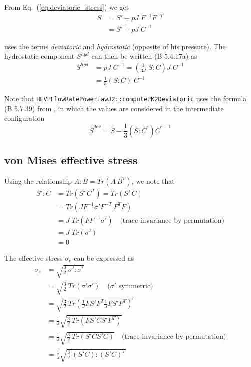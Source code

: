 \documentclass[]{scrreprt}
\begin{document}
From Eq.~(\ref{eq:deviatoric_stress}) we get
\begin{align}
	  S  & = S' + pJ\;F^{-1}F^{-T} \nonumber \\
	     & = S' + pJ\;C^{-1}
\end{align}

\citet{Belytschko2014} uses the terms \textit{deviatoric} and \textit{hydrostatic} (opposite of his pressure). The hydrostatic component $S^{hyd}$ can then be written (B 5.4.17a) as
\begin{align}
	  S^{hyd}  & = pJ\;C^{-1} = (\frac{1}{3J}\;S:C)J\;C^{-1} \nonumber \\
	     & = \frac{1}{3}(S:C)\;C^{-1}
\end{align}

Note that \texttt{HEVPFlowRatePowerLawJ2::computePK2Deviatoric} uses the formula (B 5.7.39) from \citep{Belytschko2014}, in which the values are considered in the intermediate configuration 
\begin{equation}
	\bar{S}^{dev}=\bar{S}-\frac{1}{3}(\bar{S}:\bar{C}^e)\bar{C}^{e-1}
\end{equation}

\subsection{von Mises effective stress}
Using the relationship $A:B=Tr(A\,B^T)$, we note that
\begin{align}
	  S':C  & = Tr(S'\,C^T) =  Tr(S'\,C) \nonumber \\
	        & = Tr(JF^{-1}\sigma'F^{-T}\:F^T F) \nonumber \\
	        & = J\;Tr(FF^{-1}\sigma') \quad \text{(trace invariance by permutation)} \nonumber \\
	        & = J\;Tr(\sigma') \nonumber \\
	        & = 0
\end{align}

The effective stress $\sigma_e$ can be expressed as
\begin{align}
  \sigma_e  & = \sqrt{\frac{3}{2}\:\sigma':\sigma'} \nonumber \\
	          & = \sqrt{\frac{3}{2}\:Tr\left( \sigma'\sigma' \right)} \quad \text{($\sigma'$ symmetric)} \nonumber \\
	          & = \sqrt{\frac{3}{2}\:Tr\left( \frac{1}{J}FS'F^T\frac{1}{J}FS'F^T \right)} \nonumber \\
	          & = \frac{1}{J}\sqrt{\frac{3}{2}\:Tr\left( FS'C S'F^T \right)} \nonumber \\
	          & = \frac{1}{J}\sqrt{\frac{3}{2}\:Tr\left( S'C S'C \right)}  \quad \text{(trace invariance by permutation)} \nonumber \\
	          & = \frac{1}{J}\sqrt{\frac{3}{2}\: (S'C):(S'C)^T} 
\end{align}
\end{document}
